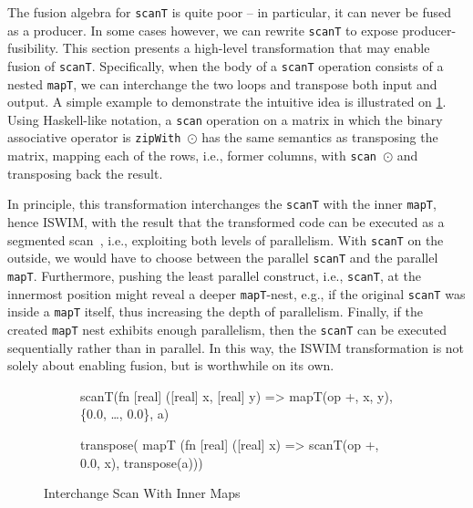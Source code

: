 The fusion algebra for \texttt{scanT} is quite poor -- in particular,
it can never be fused as a producer.  In some cases however, we can
rewrite \texttt{scanT} to expose producer-fusibility.  This section
presents a high-level transformation that may enable fusion of
\texttt{scanT}.  Specifically, when the body of a \texttt{scanT}
operation consists of a nested \texttt{mapT}, we can interchange the
two loops and transpose both input and output.  A simple example to
demonstrate the intuitive idea is illustrated on
\cref{fig:iswim-example}.  Using Haskell-like notation, a
\texttt{scan} operation on a matrix in which the binary associative
operator is \texttt{zipWith $\odot$} has the same semantics as
transposing the matrix, mapping each of the rows, i.e., former
columns, with \texttt{scan $\odot$} and transposing back the result.

In principle, this transformation interchanges the \texttt{scanT} with
the inner \texttt{mapT}, hence ISWIM, with the result that the
transformed code can be executed as a segmented scan~\cite{segScan},
i.e., exploiting both levels of parallelism.  With \texttt{scanT} on
the outside, we would have to choose between the parallel
\texttt{scanT} and the parallel \texttt{mapT}.  Furthermore, pushing
the least parallel construct, i.e., \texttt{scanT}, at the innermost
position might reveal a deeper \texttt{mapT}-nest, e.g., if the
original \texttt{scanT} was inside a \texttt{mapT} itself, thus
increasing the depth of parallelism.  Finally, if the created
\texttt{mapT} nest exhibits enough parallelism, then the
\texttt{scanT} can be executed sequentially rather than in parallel.
In this way, the ISWIM transformation is not solely about enabling
fusion, but is worthwhile on its own.

\begin{figure}
\begin{subfigure}[t]{.6\textwidth}
\begin{colorcode}
scanT(fn [real] ([real] x, [real] y) =>
        mapT(op +, x, y),
      \{0.0, \ldots, 0.0\}, a)
\end{colorcode}
\vspace{0.5cm}
\end{subfigure}%
\begin{subfigure}[t]{.4\textwidth}
\begin{colorcode}
transpose(
  mapT (fn [real] ([real] x) =>
          scanT(op +, 0.0, x),
                transpose(a)))
\end{colorcode}
\end{subfigure}
\caption{Interchange Scan With Inner Maps}
\label{fig:iswim-example}
\end{figure}

